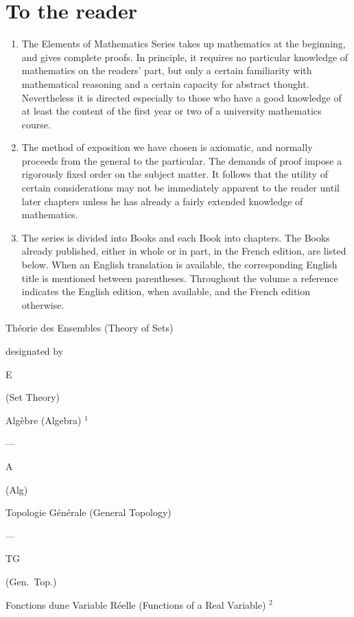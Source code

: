 \chapter*{To the reader}
{}

\begin{enumerate}
\def\labelenumi{\arabic{enumi}.}
\item
  The Elements of Mathematics Series takes up mathematics at the beginning, and gives complete proofs. In principle, it requires no particular knowledge of mathematics on the readers' part, but only a certain familiarity with mathematical reasoning and a certain capacity for abstract thought. Nevertheless it is directed especially to those who have a good knowledge of at least the content of the first year or two of a university mathematics course.
\item
  The method of exposition we have chosen is axiomatic, and normally proceeds from the general to the particular. The demands of proof impose a rigorously fixed order on the subject matter. It follows that the utility of certain considerations may not be immediately apparent to the reader until later chapters unless he has already a fairly extended knowledge of mathematics.
\item
  The series is divided into Books and each Book into chapters. The Books already published, either in whole or in part, in the French edition, are listed below. When an English translation is available, the corresponding English title is mentioned between parentheses. Throughout the volume a reference indicates the English edition, when available, and the French edition otherwise.
\end{enumerate}

Théorie des Ensembles (Theory of Sets)

designated by

E

(Set Theory)

Algèbre (Algebra) \(^{1}\)

---

A

(Alg)

Topologie Générale (General Topology)

---

TG

(Gen.~Top.)

Fonctions d\textquotesingle une Variable Réelle (Functions of a Real Variable) \(^{2}\)

